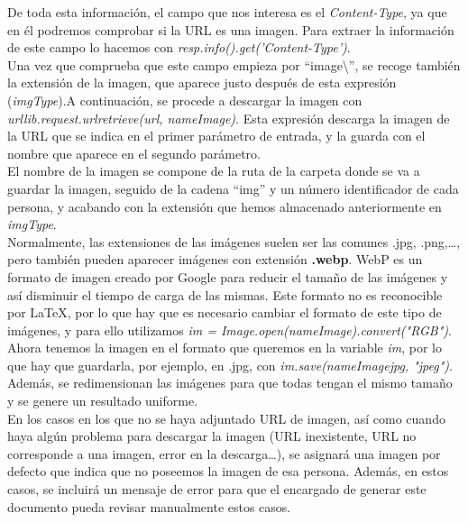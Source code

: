 \documentclass[a4paper, 12pt]{book}
\begin{document}
De toda esta información, el campo que nos interesa es el \textit{Content-Type}, ya que en él podremos comprobar si la URL es una imagen. Para extraer la información de este campo lo hacemos con \textit{resp.info().get('Content-Type')}.\\

Una vez que comprueba que este campo empieza por ``image\textbackslash'', se recoge también la extensión de la imagen, que aparece justo después de esta expresión (\textit{imgType}).A continuación, se procede a descargar la imagen con \textit{urllib.request.urlretrieve(url, nameImage)}. Esta expresión descarga la imagen de la URL que se indica en el primer parámetro de entrada, y la guarda con el nombre que aparece en el segundo parámetro.\\

El nombre de la imagen se compone de la ruta de la carpeta donde se va a guardar la imagen, seguido de la cadena ``img'' y un número identificador de cada persona, y acabando con la extensión que hemos almacenado anteriormente en \textit{imgType}.\\

Normalmente, las extensiones de las imágenes suelen ser las comunes .jpg, .png,\ldots, pero también pueden aparecer imágenes con extensión \textbf{.webp}. WebP es un formato de imagen creado por Google para reducir el tamaño de las imágenes y así disminuir el tiempo de carga de las mismas. Este formato no es reconocible por \LaTeX, por lo que hay que es necesario cambiar el formato de este tipo de imágenes, y para ello utilizamos \textit{im = Image.open(nameImage).convert("RGB")}. Ahora tenemos la imagen en el formato que queremos en la variable \textit{im}, por lo que hay que guardarla, por ejemplo, en .jpg, con \textit{im.save(nameImagejpg, "jpeg")}.\\

Además, se redimensionan las imágenes para que todas tengan el mismo tamaño y se genere un resultado uniforme.\\

En los casos en los que no se haya adjuntado URL de imagen, así como cuando haya algún problema para descargar la imagen (URL inexistente, URL no corresponde a una imagen, error en la descarga\ldots), se asignará una imagen por defecto que indica que no poseemos la imagen de esa persona. Además, en estos casos, se incluirá un mensaje de error para que el encargado de generar este documento pueda revisar manualmente estos casos.\\
\end{document}
